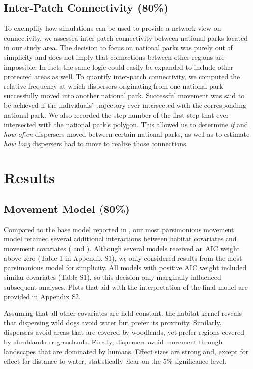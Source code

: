 \documentclass[abstract=on,10pt,a4paper,bibliography=totocnumbered]{article}
\begin{document}
\subsection{Inter-Patch Connectivity (80\%)}
To exemplify how simulations can be used to provide a network view on
connectivity, we assessed inter-patch connectivity between national parks
located in our study area. The decision to focus on national parks was purely
out of simplicity and does not imply that connections between other regions are
impossible. In fact, the same logic could easily be expanded to include other
protected areas as well. To quantify inter-patch connectivity, we computed the
relative frequency at which dispersers originating from one national park
successfully moved into another national park. Successful movement was said to
be achieved if the individuals' trajectory ever intersected with the
corresponding national park. We also recorded the step-number of the first step
that ever intersected with the national park's polygon. This allowed us to
determine \textit{if} and \textit{how often} dispersers moved between certain
national parks, as well as to estimate \textit{how long} dispersers had to move
to realize those connections.

\section{Results}
\subsection{Movement Model (80\%)}
Compared to the base model reported in \citep{Hofmann.2021}, our most
parsimonious movement model retained several additional interactions between
habitat covariates and movement covariates ( and
). Although several models received an AIC weight
above zero (Table 1 in Appendix S1), we only considered results from the most
parsimonious model for simplicity. All models with positive AIC weight included
similar covariates (Table S1), so this decision only marginally influenced
subsequent analyses. Plots that aid with the interpretation of the final model
are provided in Appendix S2.

Assuming that all other covariates are held constant, the habitat kernel reveals
that dispersing wild dogs avoid water but prefer its proximity. Similarly,
dispersers avoid areas that are covered by woodlands, yet prefer regions covered
by shrublands or grasslands. Finally, dispersers avoid movement through
landscapes that are dominated by humans. Effect sizes are strong and, except for
effect for \textsf{distance to water}, statistically clear on the 5\%
significance level.
\end{document}
